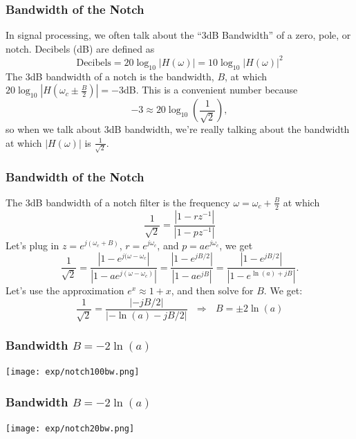 \documentclass{beamer}
\begin{document}
\begin{frame}
  \frametitle{Bandwidth of the Notch}

  In signal processing, we often talk about the ``3dB Bandwidth'' of a
  zero, pole, or notch.  Decibels (dB)  are defined as
  \begin{displaymath}
    \mbox{Decibels} = 20\log_{10}|H(\omega)| = 10\log_{10}|H(\omega)|^2
  \end{displaymath}
  The 3dB bandwidth of a notch is the bandwidth, $B$, at which
  $20\log_{10}|H\left(\omega_c\pm \frac{B}{2}\right)|=-3$dB.  This is a convenient number because
  \begin{displaymath}
    -3 \approx 20\log_{10}\left(\frac{1}{\sqrt{2}}\right),
  \end{displaymath}
  so when we talk about 3dB bandwidth, we're really talking about the
  bandwidth at which $|H(\omega)|$ is $\frac{1}{\sqrt{2}}$.
\end{frame}

\begin{frame}
  \frametitle{Bandwidth of the Notch}

  The 3dB bandwidth of a notch filter is the frequency
  $\omega=\omega_c+\frac{B}{2}$ at which
  \begin{displaymath}
    \frac{1}{\sqrt{2}} = \frac{|1-rz^{-1}|}{|1-pz^{-1}|}
  \end{displaymath}
  Let's plug in $z=e^{j(\omega_c+B)}$, $r=e^{j\omega_c}$, and $p=ae^{j\omega_c}$, we get
  \begin{displaymath}
    \frac{1}{\sqrt{2}} = \frac{|1-e^{j(\omega-\omega_c}|}{|1-ae^{j(\omega-\omega_c)}|}
    = \frac{|1-e^{jB/2}|}{|1-ae^{jB}|}
    = \frac{|1-e^{jB/2}|}{|1-e^{\ln(a)+jB}|}.
  \end{displaymath}
  Let's use the approximation $e^x\approx 1+x$, and then 
  solve for $B$.  We get:
  \begin{displaymath}
    \frac{1}{\sqrt{2}}=\frac{|-jB/2|}{|-\ln(a)-jB/2|}
    ~~~\Rightarrow~~~B = \pm 2\ln(a)
  \end{displaymath}
\end{frame}

\begin{frame}
  \frametitle{Bandwidth $B= -2\ln(a)$}

  \centerline{\texttt{[image: exp/notch100bw.png]}}
\end{frame}
\begin{frame}
  \frametitle{Bandwidth $B= -2\ln(a)$}

  \centerline{\texttt{[image: exp/notch20bw.png]}}
\end{frame}
\end{document}
